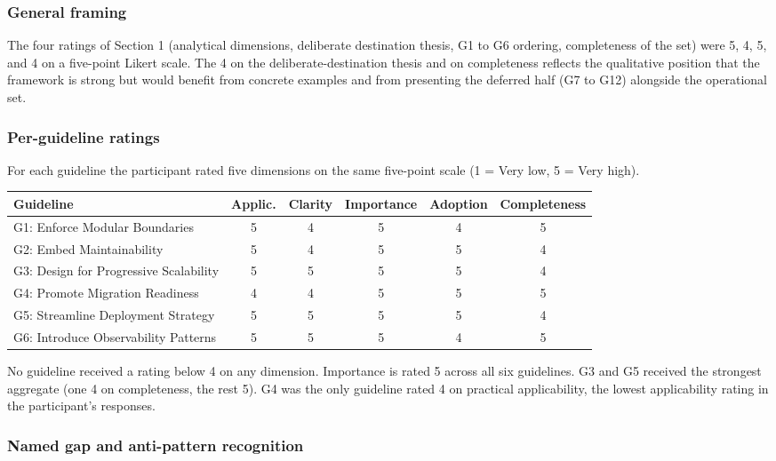 \subsubsection*{General framing}

The four ratings of Section 1 (analytical dimensions, deliberate destination thesis, G1 to G6 ordering, completeness of the set) were 5, 4, 5, and 4 on a five-point Likert scale. The 4 on the deliberate-destination thesis and on completeness reflects the qualitative position that the framework is strong but would benefit from concrete examples and from presenting the deferred half (G7 to G12) alongside the operational set.

\subsubsection*{Per-guideline ratings}

For each guideline the participant rated five dimensions on the same five-point scale (1 = Very low, 5 = Very high).

\begin{longtable}{p{5cm} c c c c c}
\toprule
\textbf{Guideline} & \textbf{Applic.} & \textbf{Clarity} & \textbf{Importance} & \textbf{Adoption} & \textbf{Completeness} \\
\midrule
\endhead
G1: Enforce Modular Boundaries  & 5 & 4 & 5 & 4 & 5 \\
G2: Embed Maintainability       & 5 & 4 & 5 & 5 & 4 \\
G3: Design for Progressive Scalability & 5 & 5 & 5 & 5 & 4 \\
G4: Promote Migration Readiness & 4 & 4 & 5 & 5 & 5 \\
G5: Streamline Deployment Strategy & 5 & 5 & 5 & 5 & 4 \\
G6: Introduce Observability Patterns & 5 & 5 & 5 & 4 & 5 \\
\bottomrule
\end{longtable}

No guideline received a rating below 4 on any dimension. Importance is rated 5 across all six guidelines. G3 and G5 received the strongest aggregate (one 4 on completeness, the rest 5). G4 was the only guideline rated 4 on practical applicability, the lowest applicability rating in the participant's responses.

\subsubsection*{Named gap and anti-pattern recognition}

